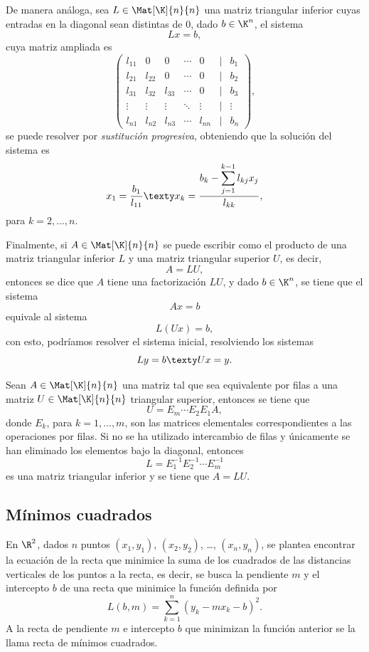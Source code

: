 \documentclass[a4,11pt]{aleph-notas}
\begin{document}
De manera análoga, sea $L\in\Mat[\K]{n}{n}$ una matriz triangular inferior cuyas entradas en la diagonal sean distintas de $0$, dado $b\in\K^n$, el sistema 
\[
    Lx = b,
\]
cuya matriz ampliada es
\[
    \begin{pmatrix}
        l_{11} & 0      & 0      & \cdots & 0      & | & b_1 \\
        l_{21} & l_{22} & 0      & \cdots & 0      & | & b_2 \\
        l_{31} & l_{32} & l_{33} & \cdots & 0      & | & b_3 \\
        \vdots & \vdots & \vdots & \ddots & \vdots & | & \vdots \\
        l_{n1} & l_{n2} & l_{n3} & \cdots & l_{nn} & | & b_n 
    \end{pmatrix},
\]
se puede resolver por \emph{sustitución progresiva}, obteniendo que la solución del sistema es
\[
    x_1 = \frac{b_1}{l_{11}}
    \texty
    x_k = \dfrac{b_k - \displaystyle\sum_{j=1}^{k-1} l_{kj}x_j}{l_{kk}},
\]
para $k=2,\ldots,n$.

Finalmente, si $A \in \Mat[\K]{n}{n}$ se puede escribir como el producto de una matriz triangular inferior $L$ y una matriz triangular superior $U$, es decir, 
\[
    A = LU,
\]
entonces se dice que $A$ tiene una factorización $LU$, y dado $b\in\K^n$, se tiene que el sistema
\[
    Ax=b
\]
equivale al sistema
\[
    L(Ux) = b,
\]
con esto, podríamos resolver el sistema inicial, resolviendo los sistemas
\[
    Ly = b
    \texty
    Ux = y.
\]


\begin{teo}[Factorización LU]
    Sean $A\in \Mat[\K]{n}{n}$ una matriz tal que sea equivalente por filas a una matriz $U\in \Mat[\K]{n}{n}$ triangular superior, entonces se tiene que
    \[
        U = E_{m}\cdots E_2 E_1 A,
    \]
    donde $E_k$, para $k=1,\ldots,m$, son las matrices elementales correspondientes a las operaciones por filas. Si no se ha utilizado intercambio de filas y únicamente se han eliminado los elementos bajo la diagonal, entonces
    \[
        L = E_{1}^{-1} E_2^{-1} \cdots E_m^{-1}
    \]
    es una matriz triangular inferior y se tiene que $A=LU$.
\end{teo}


\subsection{Mínimos cuadrados}

\begin{defi}
    En $\R^2$, dados $n$ puntos $(x_1,y_1)$, $(x_2,y_2)$, \ldots, $(x_n,y_n)$, se plantea encontrar la ecuación de la recta que minimice la suma de los cuadrados de las distancias verticales de los puntos a la recta, es decir, se busca la pendiente $m$ y el intercepto $b$ de una recta que minimice la función definida por
    \[
        L(b,m)=\sum_{k=1}^n(y_k-mx_k-b)^2.
    \]
    A la recta de pendiente $m$ e intercepto $b$ que minimizan la función anterior se la llama recta de mínimos cuadrados.
\end{defi}
\end{document}
